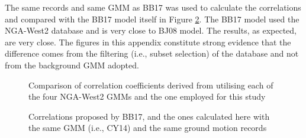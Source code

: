 \documentclass[12pt,a4paper,twoside, openright]{report}
\begin{document}
	The same records and same \gls{GMM} as BB17 was used to calculate the correlations and compared with the BB17 model itself in Figure \ref{Sa_Sa_total_correlation_comparison_slices_diff_filt}. The BB17 model used the \gls{NGA-West2} database and is very close to BJ08 model. The results, as expected, are very close. The figures in this appendix constitute strong evidence that the difference comes from the filtering (i.e., subset selection) of the database and not from the background \gls{GMM} adopted.
	
	\begin{figure}
		\centering
		
		\caption{Comparison of correlation coefficients derived from utilising each of the four \gls{NGA-West2} \glspl{GMM} and the one employed for this study}
		\label{Sa_Sa_total_correlation_comparison_slices_nga_west}
	\end{figure}
	
	\begin{figure}
		\centering
		
		\caption{Correlations proposed by BB17, and the ones calculated here with the same \gls{GMM} (i.e., CY14) and the same ground motion records}
		\label{Sa_Sa_total_correlation_comparison_slices_diff_filt}
	\end{figure}
	
	
\end{document}

